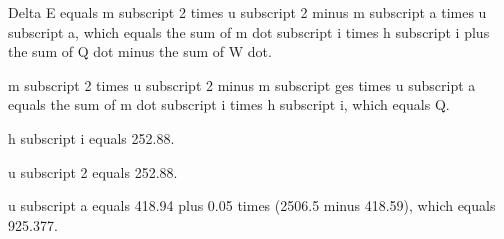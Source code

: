 Delta E equals m subscript 2 times u subscript 2 minus m subscript a times u subscript a, which equals the sum of m dot subscript i times h subscript i plus the sum of Q dot minus the sum of W dot.

m subscript 2 times u subscript 2 minus m subscript ges times u subscript a equals the sum of m dot subscript i times h subscript i, which equals Q.

h subscript i equals 252.88.

u subscript 2 equals 252.88.

u subscript a equals 418.94 plus 0.05 times (2506.5 minus 418.59), which equals 925.377.